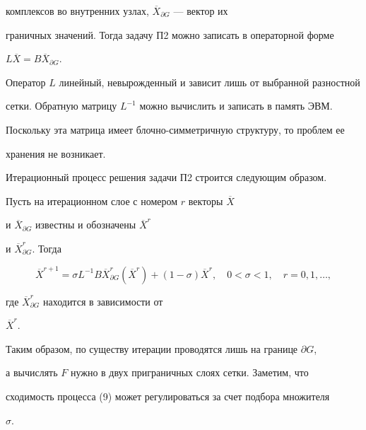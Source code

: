 комплексов во внутренних узлах, $\overline X_{\partial G}$ --- вектор их 


граничных значений. Тогда задачу П2 можно записать в операторной форме 


$L\overline X=B\overline X_{\partial G}$. 


 


Оператор $L$ линейный, невырожденный и зависит лишь от выбранной разностной 


сетки. Обратную матрицу $L^{-1}$ можно вычислить и записать в память ЭВМ. 


Поскольку эта матрица имеет блочно-симметричную структуру, то проблем ее 


хранения не возникает. 


 


Итерационный процесс решения задачи П2 строится следующим образом. 


 


Пусть на итерационном слое с номером $r$ векторы $\overline X$ 


и $\overline X_{\partial G}$ известны и обозначены $\overline X^r$ 


и $\overline X^r_{\partial G}$. Тогда 


%


\begin{equation} 


\overline X^{r+1}=\sigma L^{-1}B\overline X^r_{\partial G} 


(\overline X^r)+(1-\sigma)\overline X^r,\quad 0<\sigma<1,\quad 


r=0,1,\dotsc, \tag{9}


\end{equation} 


%


где $\overline X^r_{\partial G}$ находится в зависимости от 


$\overline X^r$. 


 


Таким образом, по существу итерации проводятся лишь на границе $\partial G$, 


а вычислять $F$ нужно в двух приграничных слоях сетки. Заметим, что 


сходимость процесса (9) может регулироваться за счет подбора множителя 


$\sigma$. 


